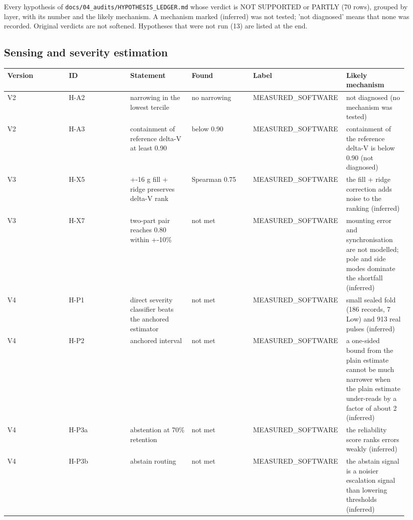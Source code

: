 


Every hypothesis of \texttt{docs/04\_audits/HYPOTHESIS\_LEDGER.md} whose verdict is NOT SUPPORTED or PARTLY (70 rows), grouped by layer, with its number and the likely mechanism. A mechanism marked (inferred) was not tested; 'not diagnosed' means that none was recorded. Original verdicts are not softened. Hypotheses that were not run (13) are listed at the end.

\subsection*{Sensing and severity estimation}

{\scriptsize\raggedright
\begin{longtable}{p{0.158\linewidth}p{0.158\linewidth}p{0.158\linewidth}p{0.158\linewidth}p{0.158\linewidth}p{0.158\linewidth}}
\toprule
Version & ID & Statement & Found & Label & Likely mechanism \\
\midrule
\endhead
V2 & H-A2 & narrowing in the lowest tercile & no narrowing & MEASURED\_SOFTWARE & not diagnosed (no mechanism was tested) \\
V2 & H-A3 & containment of reference delta-V at least 0.90 & below 0.90 & MEASURED\_SOFTWARE & containment of the reference delta-V is below 0.90 (not diagnosed) \\
V3 & H-X5 & +-16 g fill + ridge preserves delta-V rank & Spearman 0.75 & MEASURED\_SOFTWARE & the fill + ridge correction adds noise to the ranking (inferred) \\
V3 & H-X7 & two-part pair reaches 0.80 within +-10\% & not met & MEASURED\_SOFTWARE & mounting error and synchronisation are not modelled; pole and side modes dominate the shortfall (inferred) \\
V4 & H-P1 & direct severity classifier beats the anchored estimator & not met & MEASURED\_SOFTWARE & small sealed fold (186 records, 7 Low) and 913 real pulses (inferred) \\
V4 & H-P2 & anchored interval & not met & MEASURED\_SOFTWARE & a one-sided bound from the plain estimate cannot be much narrower when the plain estimate under-reads by a factor of about 2 (inferred) \\
V4 & H-P3a & abstention at 70\% retention & not met & MEASURED\_SOFTWARE & the reliability score ranks errors weakly (inferred) \\
V4 & H-P3b & abstain routing & not met & MEASURED\_SOFTWARE & the abstain signal is a noisier escalation signal than lowering thresholds (inferred) \\

\end{longtable}}
